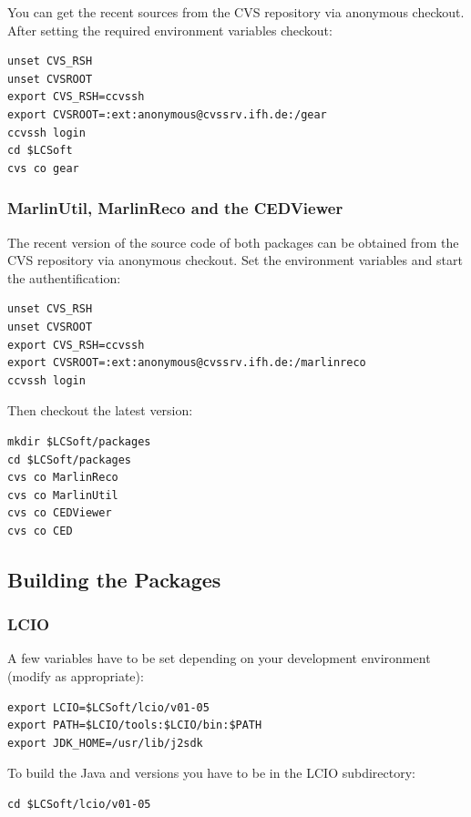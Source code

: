 You can get the recent sources from the CVS repository via anonymous checkout.
After setting the required environment variables checkout:

\begin{verbatim}
unset CVS_RSH
unset CVSROOT
export CVS_RSH=ccvssh
export CVSROOT=:ext:anonymous@cvssrv.ifh.de:/gear
ccvssh login
cd $LCSoft
cvs co gear
\end{verbatim}

\subsubsection*{MarlinUtil, MarlinReco and the CEDViewer}

The recent version of the source code of both packages can be 
obtained from the CVS repository via anonymous checkout.
Set the environment variables and start the authentification: 

\begin{verbatim}
unset CVS_RSH
unset CVSROOT
export CVS_RSH=ccvssh 
export CVSROOT=:ext:anonymous@cvssrv.ifh.de:/marlinreco
ccvssh login
\end{verbatim}

Then checkout the latest version: 

\begin{verbatim}
mkdir $LCSoft/packages 
cd $LCSoft/packages 
cvs co MarlinReco 
cvs co MarlinUtil 
cvs co CEDViewer 
cvs co CED 
\end{verbatim}

\subsection{Building the Packages}

\subsubsection*{LCIO}

A few variables have to be set depending on your development
environment (modify as appropriate):

\begin{verbatim}
export LCIO=$LCSoft/lcio/v01-05 
export PATH=$LCIO/tools:$LCIO/bin:$PATH 
export JDK_HOME=/usr/lib/j2sdk
\end{verbatim}

To build the Java and \CPP{} versions you have to be in the LCIO subdirectory:

\begin{verbatim}
cd $LCSoft/lcio/v01-05
\end{verbatim}

